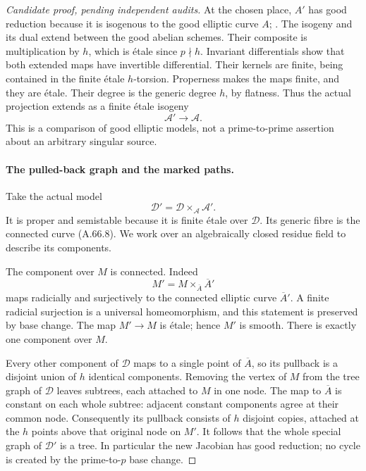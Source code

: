 \begin{proof}[Candidate proof, pending independent audits]
At the chosen place, \(A'\) has good reduction because it is
isogenous to the good elliptic curve \(A\);
\cite[Theorem 1 and Corollary 2, p.~493]{fghSerreTate1968}.
The isogeny and its dual extend between the good abelian
schemes. Their composite is multiplication by \(h\), which
is étale since \(p\nmid h\). Invariant differentials show
that both extended maps have invertible differential.
Their kernels are finite, being contained in the
finite étale \(h\)-torsion. Properness makes the maps
finite, and they are étale. Their degree is the generic
degree \(h\), by flatness. Thus the actual projection
extends as a finite étale isogeny
\[
                    \mathcal A'\longrightarrow\mathcal A .
                                                               \tag{A.66.9}
\]
This is a comparison of good elliptic models, not a
prime-to-prime assertion about an arbitrary singular source.

\paragraph{The pulled-back graph and the marked paths.}
Take the actual model
\[
              \mathcal D'=\mathcal D
                              \times_{\mathcal A}\mathcal A'.
                                                               \tag{A.66.10}
\]
It is proper and semistable because it is finite étale
over \(\mathcal D\). Its generic fibre is the connected
curve (A.66.8). We work over an algebraically closed
residue field to describe its components.

The component over \(M\) is connected. Indeed
\[
                   M'=M\times_{\overline A}\overline A'
\]
maps radicially and surjectively to the connected elliptic
curve \(\overline A'\). A finite radicial surjection is a
universal homeomorphism, and this statement is preserved
by base change. The map \(M'\to M\) is étale; hence
\(M'\) is smooth. There is exactly one component over \(M\).

Every other component of \(\mathcal D\) maps to a single
point of \(\overline A\), so its pullback is a disjoint
union of \(h\) identical components. Removing the vertex
of \(M\) from the tree graph of \(\mathcal D\) leaves
subtrees, each attached to \(M\) in one node. The map to
\(\overline A\) is constant on each whole subtree: adjacent
constant components agree at their common node.
Consequently its pullback consists of \(h\) disjoint
copies, attached at the \(h\) points above that original
node on \(M'\). It follows that the whole special graph
of \(\mathcal D'\) is a tree. In particular the new
Jacobian has good reduction; no cycle is created by the
prime-to-\(p\) base change.


\end{proof}
